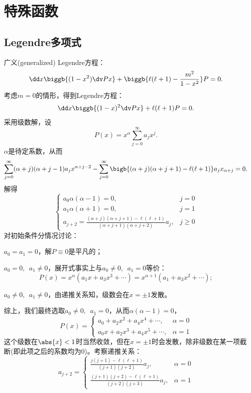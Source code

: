 \chapter{特殊函数}

\section{Legendre多项式}
\label{sec:Legendre polynomial}

广义(generalized) Legendre方程：
\begin{equation}
    \dd x\biggb{(1-x^2)\dv Px}+\biggb{\ell(\ell+1)-\frac{m^2}{1-x^2}}P=0.
\end{equation}
考虑$m=0$的情形，得到Legendre方程：
\begin{equation}
    \dd x\biggb{(1-x)^2\dv Px}+\ell(\ell+1)P=0.
\end{equation}
采用级数解，设
\[
    P(x)=x^\alpha\sum_{j=0}^\infty a_jx^j.
\]
$\alpha$是待定系数，从而 
\[
    \sum_{j=0}^\infty(\alpha+j)(\alpha+j-1)a_j x^{\alpha+j-2}-\sum_{j=0}^\infty\bigb{(\alpha+j)(\alpha+j+1)-\ell(\ell+1)}a_jx_{\alpha+j}=0.
\]
解得
\[
    \begin{cases}
        a_0\alpha(\alpha-1)=0,&j=0\\
        a_1\alpha(\alpha+1)=0,&j=1\\
        a_{j+2}=\frac{(\alpha+j)(\alpha+j+1)-\ell(\ell+1)}{(\alpha+j+1)(\alpha+j+2)}a_j,&j\geqslant 0
    \end{cases}
\]
对初始条件分情况讨论：
\begin{compactitem}
	\item $a_0=a_1=0$，解$P\equiv 0$是平凡的；
	\item $a_0=0,\enspace a_1\neq 0$，展开式事实上与$a_0\neq 0,\enspace a_1=0$等价：
	\[
        P(x)=x^\alpha(a_1x+a_3x^3+\cdots)=x^{\alpha+1}(a_1+a_3x^2+\cdots);
    \]
	\item $a_0\neq 0,\enspace a_1\neq 0$，由递推关系知，级数会在$x=\pm 1$发散。
\end{compactitem}
综上，我们最终选取$a_0\neq 0,\enspace a_1=0$，从而$\alpha(\alpha-1)=0$，
\[
    P(x)=\begin{cases}
        a_0+a_2x^2+a_4x^4+\cdots,&\alpha=0\\
        a_0x+a_2x^3+a_4x^5+\cdots,&\alpha=1
    \end{cases}
\]
这个级数在$\abs{x}<1$时当然收敛，但在$x=\pm 1$时会发散，除非级数在某一项截断(即此项之后的系数均为0)。考察递推关系：
\[
    a_{j+2}=\begin{cases}
        \frac{j(j+1)-\ell(\ell+1)}{(j+1)(j+2)}a_j,&\alpha=0\\[2ex]
        \frac{(j+1)(j+2)-\ell(\ell+1)}{(j+2)(j+3)}a_j,&\alpha=1
    \end{cases}
\]
